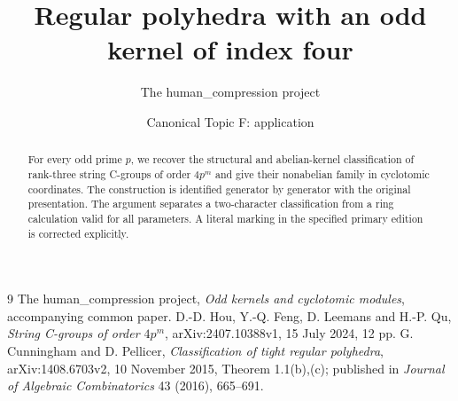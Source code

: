 
\title{Regular polyhedra with an odd kernel of index four}
\author{The human\_compression project}
\date{Canonical Topic F: application}

\maketitle
\begin{abstract}
For every odd prime $p$, we recover the structural and abelian-kernel
classification of rank-three string C-groups of order $4p^m$ and give
their nonabelian family in cyclotomic coordinates. The construction is
identified generator by generator with the original presentation.
The argument separates a two-character classification from a ring
calculation valid for all parameters. A literal marking in the specified
primary edition is corrected explicitly.
\end{abstract}





\begin{thebibliography}{9}
 The human\_compression project,
\emph{Odd kernels and cyclotomic modules}, accompanying common paper.
 D.-D. Hou, Y.-Q. Feng, D. Leemans and H.-P. Qu,
\emph{String C-groups of order $4p^m$}, arXiv:2407.10388v1,
15 July 2024, 12 pp.
 G. Cunningham and D. Pellicer,
\emph{Classification of tight regular polyhedra}, arXiv:1408.6703v2,
10 November 2015, Theorem 1.1(b),(c); published in
\emph{Journal of Algebraic Combinatorics} 43 (2016), 665--691.
\end{thebibliography}

